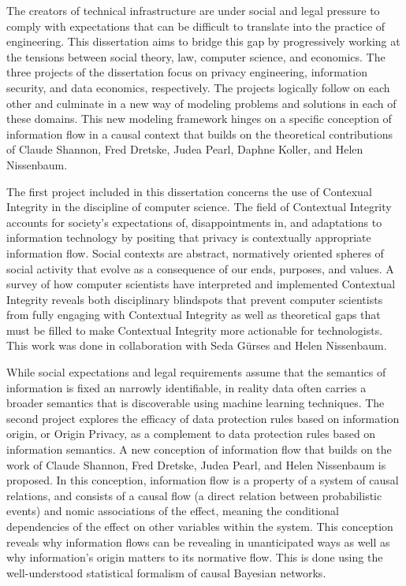 \documentclass[../thesis.tex]{subfiles}
\begin{document}
The creators of technical infrastructure are under social and legal pressure to comply with expectations that can be difficult to translate into the practice of engineering.
This dissertation aims to bridge this gap by progressively working at the tensions between social theory, law, computer science, and economics.
The three projects of the dissertation focus on privacy engineering, information security, and data economics, respectively.
The projects logically follow on each other and culminate in a new way of modeling problems and solutions in each of these domains.
This new modeling framework hinges on a specific conception of information flow in a causal context that builds on the theoretical contributions of Claude Shannon, Fred Dretske, Judea Pearl, Daphne Koller, and Helen Nissenbaum.

The first project included in this dissertation concerns the use
of Contexual Integrity in the discipline of computer science.
The field of Contextual Integrity accounts for society's expectations of,
disappointments in, and adaptations to information technology by
positing that privacy is contextually appropriate
information flow.
Social contexts are abstract, normatively oriented spheres of social activity
that evolve as a consequence of our ends, purposes, and values.
A survey of how computer scientists have interpreted and implemented
Contextual Integrity reveals both disciplinary blindspots that prevent
computer scientists from fully engaging with Contextual Integrity
as well as theoretical
gaps that must be filled to make Contextual Integrity more actionable for
technologists. This work was done in collaboration with Seda G{\"u}rses
and Helen Nissenbaum.

While social expectations and legal requirements assume that the semantics of information is fixed an narrowly identifiable, in reality data often carries a broader semantics that is discoverable using machine learning techniques.
The second project explores the efficacy of data protection
rules based on information origin, or Origin Privacy, as
a complement to data protection rules based on information
semantics.
A new conception of information flow that builds on the
work of Claude Shannon, Fred Dretske, Judea Pearl, and
Helen Nissenbaum is proposed.
In this conception, information flow is a property of a
system of causal relations, and consists of a causal flow
(a direct relation between probabilistic events) and nomic
associations of the effect, meaning the conditional dependencies
of the effect on other variables within the system.
This conception reveals why information flows can be revealing
in unanticipated ways as well as why information's origin matters
to its normative flow.
This is done using the well-understood statistical formalism
of causal Bayesian networks.
\end{document}
